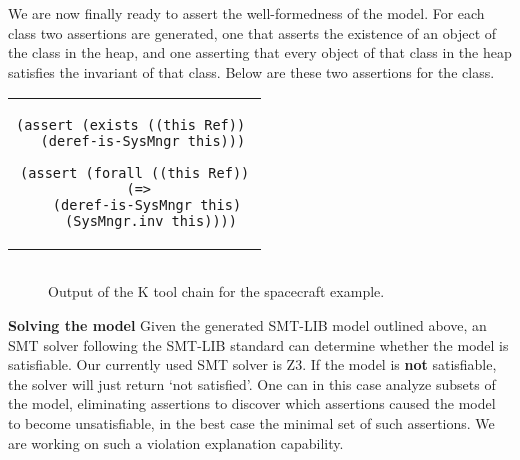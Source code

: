 We are now finally ready to assert the well-formedness of the
model. For each class two assertions are generated, one that asserts
the existence of an object of the class in the heap, and one asserting
that every object of that class in the heap satisfies the invariant of
that class. Below are these two assertions for the 
class.

\begin{center}
\begin{tabular}{c}
\small
\begin{lstlisting}
(assert (exists ((this Ref)) 
  (deref-is-SysMngr this)))

(assert (forall ((this Ref))
  (=> 
    (deref-is-SysMngr this) 
    (SysMngr.inv this))))
\end{lstlisting}
\end{tabular}
\end{center}

\begin{figure*}[!t]
\centering
  \lstset{language=SMT,numbers=none}
  \small
  \begin{tabular}{c}
  \end{tabular}
  \caption{Output of the K tool chain for the spacecraft example.}
  \label{fig:shapes}
\end{figure*}

\textbf{Solving the model} Given the generated SMT-LIB model outlined
above, an SMT solver following the SMT-LIB standard can determine
whether the model is satisfiable. Our currently used SMT solver is
Z3. If the model is {\bf not} satisfiable, the solver will just return
`not satisfied'. One can in this case analyze subsets of the model,
eliminating assertions to discover which assertions caused the model
to become unsatisfiable, in the best case the minimal set of such
assertions. We are working on such a violation explanation capability.

